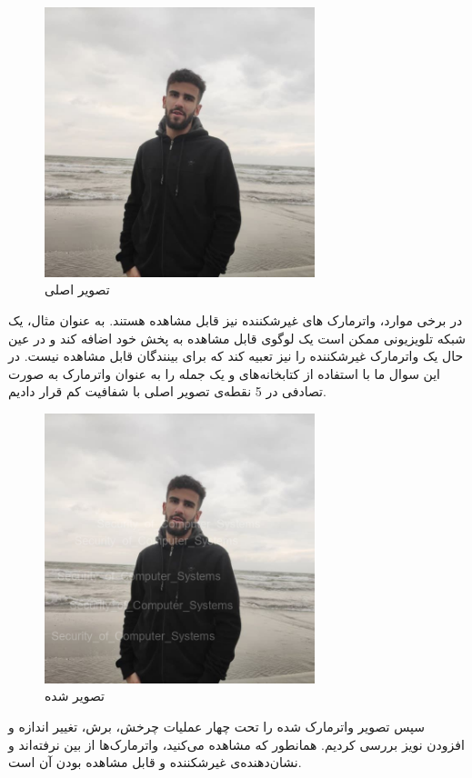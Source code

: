 \begin{figure}[H]
  \centering
  \includegraphics[width=0.7\textwidth]{Images/farzan.jpg}
  \caption{تصویر اصلی}   
\end{figure}
در برخی موارد، واترمارک های غیرشکننده نیز قابل مشاهده هستند. به عنوان مثال، یک شبکه تلویزیونی ممکن است یک لوگوی قابل مشاهده به پخش خود اضافه کند و در عین حال یک واترمارک غیرشکننده را نیز تعبیه کند که برای بینندگان قابل مشاهده نیست.
در این سوال ما با استفاده از کتابخانه‌های  و  یک جمله را به عنوان واترمارک به صورت تصادفی در 5 نقطه‌ی تصویر اصلی با شفافیت کم قرار دادیم.
\begin{figure}[H]
  \centering
  \includegraphics[width=0.7\textwidth]{Images/watermarked.png}
  \caption{تصویر  شده}   
\end{figure}
سپس تصویر واترمارک شده را تحت چهار عملیات چرخش، برش، تغییر اندازه و افزودن نویز بررسی کردیم. همانطور که مشاهده می‌کنید، واترمارک‌ها از بین نرفته‌اند و نشان‌دهنده‌ی غیرشکننده و قابل مشاهده بودن آن است. 
